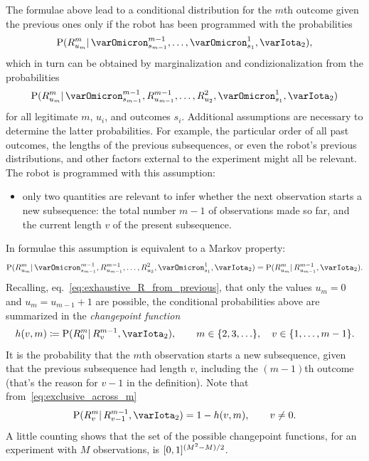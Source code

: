 \documentclass[\ifafour a4paper,12pt,\else a5paper,10pt,\fi%
onecolumn,oneside,article,%
british%
]{memoir}
\theoremstyle{remark}
\theoremstyle{innote}
\newcommand*{\defd}{\coloneqq}
\DeclarePairedDelimiter\clcl{[}{]}
\DeclarePairedDelimiter\set{\{}{\}}
\newcommand*{\p}{\mathrm{P}}%
\renewcommand*{\|}{\mathpunct{|}}
\newcommand*{\eqn}{eq.}%
\newcommand*{\yI}{\varIota}
\newcommand*{\yO}{\varOmicron}
\newcommand*{\yMc}{\yI_2}
\newcommand*{\yrs}{h}
\begin{document}
The formulae above lead to a conditional distribution for the $m$th outcome
given the previous ones only if the robot has been programmed with the
probabilities
\begin{equation}
  \label{eq:prob_R_conditional_only_data_before}
  \p(R^{m}_{u_{m}} \| \yO^{m-1}_{s_{m-1}},\dotsc, \yO^{1}_{s_{1}}, \yMc),
\end{equation}
which in turn can be obtained by marginalization and condizionalization
from the probabilities
\begin{equation}
  \label{eq:prob_R_conditional_before}
  \p(R^{m}_{u_{m}} \| \yO^{m-1}_{s_{m-1}}, R^{m-1}_{u_{m-1}},\dotsc,
  R^{2}_{u_{2}}, \yO^{1}_{s_{1}}, \yMc)
\end{equation}
for all legitimate $m$, $u_i$, and outcomes $s_i$. Additional assumptions
are necessary to determine the latter probabilities. For example, the
particular order of all past outcomes, the lengths of the previous
subsequences, or even the robot's previous distributions, and other factors
external to the experiment might all be relevant. The robot is programmed
with this assumption:
\begin{itemize}
\item only two quantities are relevant to infer whether the next
  observation starts a new subsequence: the total number $m-1$ of
  observations made so far, and the current length $v$ of the present
  subsequence.
\end{itemize}
In formulae this assumption is equivalent to a Markov property:
\begin{equation}
  \label{eq:prob_R_markov}
  \p(R^{m}_{u_{m}} \| \yO^{m-1}_{s_{m-1}}, R^{m-1}_{u_{m-1}},\dotsc,
  R^{2}_{u_{2}}, \yO^{1}_{s_{1}}, \yMc) =
  \p(R^{m}_{u_{m}} \|  R^{m-1}_{u_{m-1}}, \yMc).
\end{equation}
Recalling, \eqn~\eqref{eq:exhaustive_R_from_previous}, that only the values
$u_{m}=0$ and $u_{m}= u_{m-1}+1$ are possible, the conditional
probabilities above are summarized in the \emph{changepoint function}
\begin{equation}\label{eq:def_changepoint_function}
  \yrs(v,m)  \defd \p(R^{m}_{0} \|  R^{m-1}_{v}, \yMc),
  \qquad m \in\set{2,3,\dotsc}, \quad v\in\set{1,\dotsc,m-1}.
\end{equation}
It is the probability that the $m$th observation starts a new subsequence,
given that the previous subsequence had length $v$, including the $(m-1)$th
outcome (that's the reason for $v-1$ in the definition). Note that
from~\eqref{eq:exclusive_across_m}
\begin{equation}\label{eq:one_minus_h}
  \p(R^{m}_{v} \|  R^{m-1}_{v-1}, \yMc)  = 1-\yrs(v,m),\qquad v\ne 0.
\end{equation}
A little counting shows that the set of the possible changepoint functions,
for an experiment with $M$ observations, is $\clcl{0,1}^{(M^2-M)/2}$.
\end{document}
